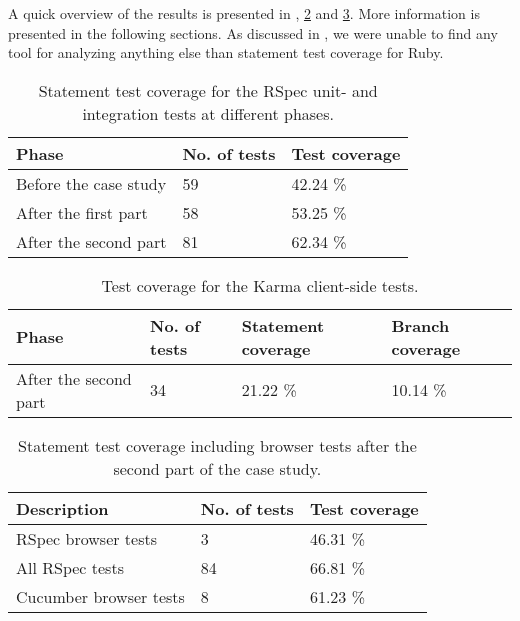\label{sec:results_coverage}

A quick overview of the results is presented in
, \ref{tab:client_coverage} and
\ref{tab:browser_coverage}. More information is presented in the
following sections. As discussed in , we
were unable to find any tool for analyzing anything else than statement
test coverage for Ruby.\\

\begin{table}[t]
    \centering
    \begin{tabular}{l l l}
        Phase & No. of tests & Test coverage\\
        \hline
        Before the case study &       59 & 42.24 \%\\
        After the first part  &       58 & 53.25 \%\\
        After the second part &       81 & 62.34 \%\\
    \end{tabular}
    \caption{ Statement test coverage for the RSpec unit- and integration tests at different phases. }
    \label{tab:unit_coverage}
\end{table}

\begin{table}[t]
    \centering
    \begin{tabular}{l l l l}
        Phase & No. of tests & Statement coverage & Branch coverage\\
        \hline
        After the second part & 34 & 21.22 \% & 10.14 \%\\
    \end{tabular}
    \caption{ Test coverage for the Karma client-side tests. }
    \label{tab:client_coverage}
\end{table}

\begin{table}[t]
    \centering
    \begin{tabular}{l l l}
        Description & No. of tests & Test coverage\\
        \hline
        RSpec browser tests &     3 & 46.31 \%\\
        All RSpec tests &        84 & 66.81 \%\\
        Cucumber browser tests &  8 & 61.23 \%\\
    \end{tabular}
    \caption{ Statement test coverage including browser tests after the second part of the case study. }
    \label{tab:browser_coverage}
\end{table}

